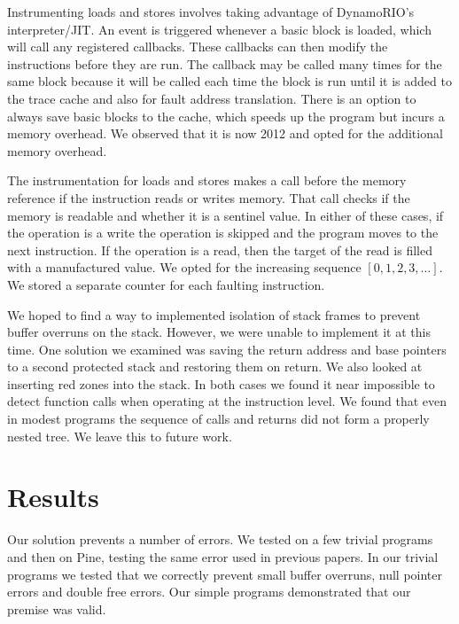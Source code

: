 \documentclass{article}
\begin{document}
Instrumenting loads and stores involves taking advantage of DynamoRIO's interpreter/JIT.  An event is triggered whenever a basic block is loaded, which will call any registered callbacks.  These callbacks can then modify the instructions before they are run.  The callback may be called many times for the same block because it will be called each time the block is run until it is added to the trace cache and also for fault address translation.  There is an option to always save basic blocks to the cache, which speeds up the program but incurs a memory overhead.  We observed that it is now 2012 and opted for the additional memory overhead.

The instrumentation for loads and stores makes a call before the memory reference if the instruction reads or writes memory.  That call checks if the memory is readable and whether it is a sentinel value.  In either of these cases, if the operation is a write the operation is skipped and the program moves to the next instruction.  If the operation is a read, then the target of the read is filled with a manufactured value.  We opted for the increasing sequence $[0,1,2,3,\dots]$.  We stored a separate counter for each faulting instruction.

We hoped to find a way to implemented isolation of stack frames to prevent buffer overruns on the stack.  However, we were unable to implement it at this time.  One solution we examined was saving the return address and base pointers to a second protected stack and restoring them on return.  We also looked at inserting red zones into the stack.  In both cases we found it near impossible to detect function calls when operating at the instruction level.  We found that even in modest programs the sequence of calls and returns did not form a properly nested tree.  We leave this to future work.


\section{Results} %
\label{sec:Results}

Our solution prevents a number of errors.  We tested on a few trivial programs and then on Pine, testing the same error used in previous papers.  %
In our trivial programs we tested that we correctly prevent small buffer overruns, null pointer errors and double free errors.  Our simple programs demonstrated that our premise was valid.
\end{document}
